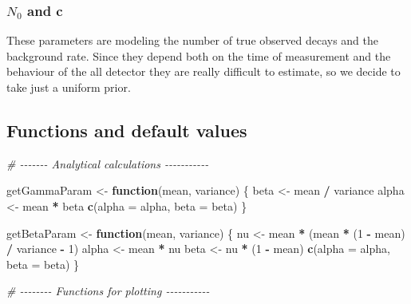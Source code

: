 \documentclass[
]{article}
\newenvironment{Shaded}{\begin{snugshade}}{\end{snugshade}}
\newcommand{\AttributeTok}[1]{\textcolor[rgb]{0.13,0.29,0.53}{#1}}
\newcommand{\CommentTok}[1]{\textcolor[rgb]{0.56,0.35,0.01}{\textit{#1}}}
\newcommand{\ControlFlowTok}[1]{\textcolor[rgb]{0.13,0.29,0.53}{\textbf{#1}}}
\newcommand{\DecValTok}[1]{\textcolor[rgb]{0.00,0.00,0.81}{#1}}
\newcommand{\FunctionTok}[1]{\textcolor[rgb]{0.13,0.29,0.53}{\textbf{#1}}}
\newcommand{\NormalTok}[1]{#1}
\newcommand{\OtherTok}[1]{\textcolor[rgb]{0.56,0.35,0.01}{#1}}
\newcommand{\SpecialCharTok}[1]{\textcolor[rgb]{0.81,0.36,0.00}{\textbf{#1}}}
\begin{document}
\subsubsection{\texorpdfstring{\(N_0\) and
c}{N\_0 and c}}\label{n_0-and-c}

These parameters are modeling the number of true observed decays and the
background rate. Since they depend both on the time of measurement and
the behaviour of the all detector they are really difficult to estimate,
so we decide to take just a uniform prior.

\subsection{Functions and default
values}\label{functions-and-default-values}

\begin{Shaded}
\begin{Highlighting}[]
\CommentTok{\# {-}{-}{-}{-}{-}{-}{-} Analytical calculations {-}{-}{-}{-}{-}{-}{-}{-}{-}{-}{-}}

\NormalTok{getGammaParam }\OtherTok{\textless{}{-}} \ControlFlowTok{function}\NormalTok{(mean, variance) \{}
\NormalTok{  beta }\OtherTok{\textless{}{-}}\NormalTok{ mean }\SpecialCharTok{/}\NormalTok{ variance}
\NormalTok{  alpha }\OtherTok{\textless{}{-}}\NormalTok{ mean }\SpecialCharTok{*}\NormalTok{ beta}
  \FunctionTok{c}\NormalTok{(}\AttributeTok{alpha =}\NormalTok{ alpha, }\AttributeTok{beta =}\NormalTok{ beta)}
\NormalTok{\}}

\NormalTok{getBetaParam }\OtherTok{\textless{}{-}} \ControlFlowTok{function}\NormalTok{(mean, variance) \{}
\NormalTok{  nu }\OtherTok{\textless{}{-}}\NormalTok{ mean }\SpecialCharTok{*}\NormalTok{ (mean }\SpecialCharTok{*}\NormalTok{ (}\DecValTok{1} \SpecialCharTok{{-}}\NormalTok{ mean) }\SpecialCharTok{/}\NormalTok{ variance }\SpecialCharTok{{-}} \DecValTok{1}\NormalTok{)}
\NormalTok{  alpha }\OtherTok{\textless{}{-}}\NormalTok{ mean }\SpecialCharTok{*}\NormalTok{ nu}
\NormalTok{  beta }\OtherTok{\textless{}{-}}\NormalTok{ nu }\SpecialCharTok{*}\NormalTok{ (}\DecValTok{1} \SpecialCharTok{{-}}\NormalTok{ mean)}
  \FunctionTok{c}\NormalTok{(}\AttributeTok{alpha =}\NormalTok{ alpha, }\AttributeTok{beta =}\NormalTok{ beta)}
\NormalTok{\}}

\CommentTok{\# {-}{-}{-}{-}{-}{-}{-}{-} Functions for plotting {-}{-}{-}{-}{-}{-}{-}{-}{-}{-}{-}}


\end{Highlighting}
\end{Shaded}
\end{document}

